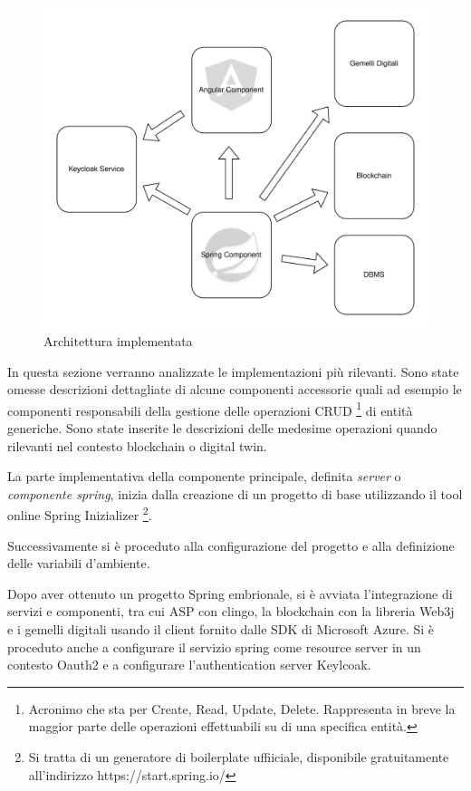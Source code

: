 \documentclass[a4paper,11pt]{article}
\begin{document}
\begin{figure}[H]
  \includegraphics[width=1\linewidth]{img/architettura.png}
  \caption{Architettura implementata}
  \label{fig:architettura}
\end{figure}
In questa sezione verranno analizzate le implementazioni più rilevanti. Sono state omesse descrizioni dettagliate di alcune componenti accessorie quali ad esempio le componenti responsabili della gestione delle operazioni CRUD \footnote{Acronimo che sta per Create, Read, Update, Delete. Rappresenta in breve la maggior parte delle operazioni effettuabili su di una specifica entità.} di entità generiche. Sono state inserite le descrizioni delle medesime operazioni quando rilevanti nel contesto blockchain o digital twin.

La parte implementativa della componente principale, definita \textit{server} o \textit{componente spring}, inizia dalla creazione di un progetto di base utilizzando il tool online Spring Inizializer \footnote{Si tratta di un generatore di boilerplate uffiiciale, disponibile gratuitamente all'indirizzo https://start.spring.io/}.

Successivamente si è proceduto alla configurazione del progetto e alla definizione delle variabili d'ambiente.

Dopo aver ottenuto un progetto Spring embrionale, si è avviata l'integrazione di servizi e componenti, tra cui ASP con clingo, la blockchain con la libreria Web3j e i gemelli digitali usando il client fornito dalle SDK di Microsoft Azure. Si è proceduto anche a configurare il servizio spring come resource server in un contesto Oauth2 e a configurare l'authentication server Keylcoak.
\end{document}
